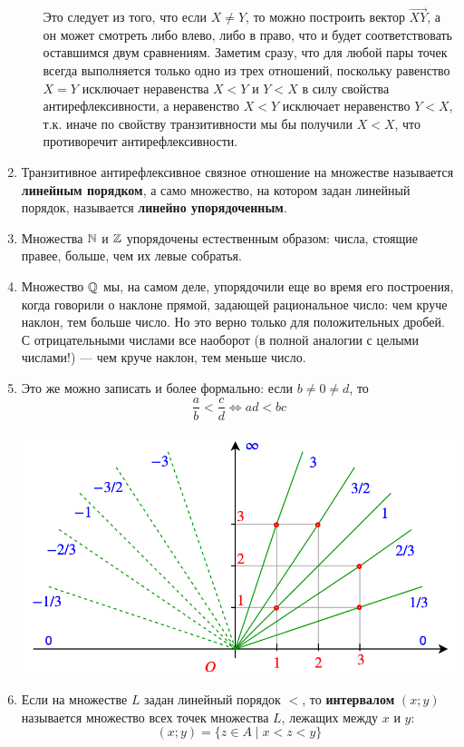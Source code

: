 \begin{enumerate}
\begin{enumerate}[{\bf Rel1}]
Это следует из того, что если $X\ne Y$, то можно построить вектор $\vec{XY}$, а он может смотреть либо влево, либо в право, что и будет соответствовать оставшимся двум сравнениям. Заметим сразу, что для любой пары точек всегда выполняется только одно из трех отношений, поскольку равенство $X=Y$ исключает неравенства $X<Y$ и $Y<X$ в силу свойства антирефлексивности, а неравенство $X<Y$ исключает неравенство $Y<X$, т.к. иначе по свойству транзитивности мы бы получили $X<X$, что противоречит антирефлексивности.
\end{enumerate}
\item Транзитивное антирефлексивное связное отношение на множестве называется \textbf{линейным порядком}, а само множество, на котором задан линейный порядок, называется \textbf{линейно упорядоченным}.
\item Множества $\mathbb N$ и $\mathbb Z$ упорядочены естественным образом: числа, стоящие правее, больше, чем их левые собратья.
\item Множество $\mathbb Q$ мы, на самом деле, упорядочили еще во время его построения, когда говорили о наклоне прямой, задающей рациональное число: чем круче наклон, тем больше число. Но это верно только для положительных дробей. С отрицательными числами все наоборот (в полной аналогии с целыми числами!) --- чем круче наклон, тем меньше число.
\item Это же можно записать и более формально: если $b\ne 0\ne d$, то
$$
\frac{a}{b}<\frac{c}{d}\Leftrightarrow ad<bc
$$
\begin{center}
\includegraphics[scale=0.3]{ratio.png}
\end{center}
\item Если на множестве $L$ задан линейный порядок $<$, то \textbf{интервалом} $(x;y)$ называется множество всех точек множества $L$, лежащих между $x$ и $y$:
$$
(x;y) = \{z\in A\mid x<z<y\}
$$

\end{enumerate}
